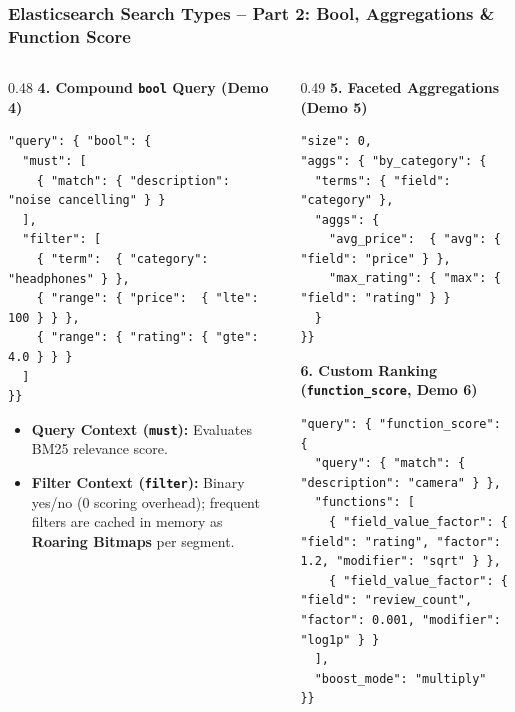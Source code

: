 \documentclass[aspectratio=169]{beamer}
\begin{document}
\begin{frame}[fragile]
\frametitle{Elasticsearch Search Types -- Part 2: Bool, Aggregations \& Function Score}
\begin{columns}[T]
\begin{column}{0.48\textwidth}
\textbf{\scriptsize 4. Compound \texttt{bool} Query (Demo 4)}
\begin{lstlisting}
"query": { "bool": {
  "must": [
    { "match": { "description": "noise cancelling" } }
  ],
  "filter": [
    { "term":  { "category": "headphones" } },
    { "range": { "price":  { "lte": 100 } } },
    { "range": { "rating": { "gte": 4.0 } } }
  ]
}}
\end{lstlisting}
\scriptsize
\begin{itemize}
    \item \textbf{Query Context (\texttt{must}):} Evaluates BM25 relevance score.
    \item \textbf{Filter Context (\texttt{filter}):} Binary yes/no ($0$ scoring overhead); frequent filters are cached in memory as \textbf{Roaring Bitmaps} per segment.
\end{itemize}
\end{column}
\begin{column}{0.49\textwidth}
\textbf{\scriptsize 5. Faceted Aggregations (Demo 5)}
\begin{lstlisting}
"size": 0,
"aggs": { "by_category": {
  "terms": { "field": "category" },
  "aggs": {
    "avg_price":  { "avg": { "field": "price" } },
    "max_rating": { "max": { "field": "rating" } }
  }
}}
\end{lstlisting}

\textbf{\scriptsize 6. Custom Ranking (\texttt{function\_score}, Demo 6)}
\begin{lstlisting}
"query": { "function_score": {
  "query": { "match": { "description": "camera" } },
  "functions": [
    { "field_value_factor": { "field": "rating", "factor": 1.2, "modifier": "sqrt" } },
    { "field_value_factor": { "field": "review_count", "factor": 0.001, "modifier": "log1p" } }
  ],
  "boost_mode": "multiply"
}}
\end{lstlisting}
\end{column}
\end{columns}
\end{frame}
\end{document}
